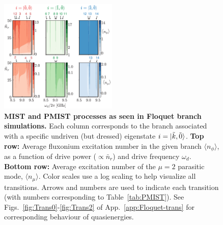 \documentclass[%
reprint,
superscriptaddress,
 amsmath,amssymb,
 aps,
 prx,
longbibliography,
floatfix,
]{revtex4-2}
\begin{document}
\begin{figure}[!htb]
    \centering
    \includegraphics[width=0.5\textwidth]{Figures/Floquet_min.pdf}
    \caption{{\bf MIST and PMIST processes as seen in Floquet branch simulations.}  
    Each column corresponds to the branch associated with a specific undriven (but dressed) eigenstate $i=\ket{\tilde{k},\tilde{0}}$.  
    \textbf{Top row:} Average fluxonium excitation number in the given branch $\langle n_\phi\rangle $, as a function of drive power ($\propto\bar{n}_r$) and drive frequency $\omega_d$. \textbf{Bottom row:} Average excitation number of the $\mu=2$ parasitic mode, $\langle n_\mu\rangle$. Color scales use a log scaling to help visualize all transitions.  Arrows and numbers are used to indicate each transition (with numbers corresponding to Table~\ref{tab:PMIST}). See Figs.~\ref{fig:Trans0}-\ref{fig:Trans2} of App.~\ref{app:Floquet-trans} for corresponding behaviour of  quasienergies.}
    \label{fig:Floquet}
\end{figure}
\end{document}
